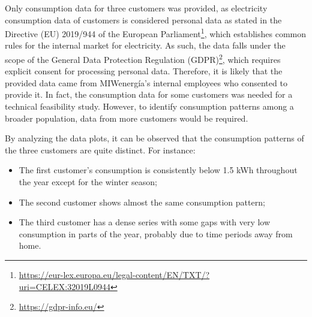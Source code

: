 Only consumption data for three customers was provided, as electricity consumption data of customers is considered personal data as stated in the Directive (EU) 2019/944 of the European Parliament\footnote{ \url{https://eur-lex.europa.eu/legal-content/EN/TXT/?uri=CELEX:32019L0944} }, which establishes common rules for the internal market for electricity.
As such, the data falls under the scope of the General Data Protection Regulation (GDPR)\footnote{ \url{https://gdpr-info.eu/} }, which requires explicit consent for processing personal data.
Therefore, it is likely that the provided data came from MIWenergía's internal employees who consented to provide it.
In fact, the consumption data for some customers was needed for a technical feasibility study.
However, to identify consumption patterns among a broader population, data from more customers would be required.

By analyzing the data plots, it can be observed that the consumption patterns of the three customers are quite distinct.
For instance:
\begin{itemize}
  \item The first customer's consumption is consistently below 1.5 kWh throughout the year except for the winter season;
  \item The second customer shows almost the same consumption pattern;
  \item The third customer has a dense series with some gaps with very low consumption in parts of the year, probably due to time periods away from home.
\end{itemize}

